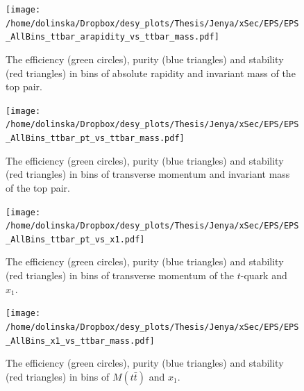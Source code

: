 \begin{figure}[p]
  \centering
  \texttt{[image: /home/dolinska/Dropbox/desy\_plots/Thesis/Jenya/xSec/EPS/EPS\_AllBins\_ttbar\_arapidity\_vs\_ttbar\_mass.pdf]}
  \caption{The efficiency (green circles), purity (blue triangles) and stability (red triangles) in bins of absolute rapidity and invariant mass of the top pair.}
  \label{fig:EPS_2D_ytt_Mtt}
\end{figure}

\begin{figure}[p]
  \centering
  \texttt{[image: /home/dolinska/Dropbox/desy\_plots/Thesis/Jenya/xSec/EPS/EPS\_AllBins\_ttbar\_pt\_vs\_ttbar\_mass.pdf]}
  \caption{The efficiency (green circles), purity (blue triangles) and stability (red triangles) in bins of transverse momentum and invariant mass of the top pair.}
  \label{fig:EPS_2D_pttt_Mtt}
\end{figure}

\begin{figure}[p]
  \centering
  \texttt{[image: /home/dolinska/Dropbox/desy\_plots/Thesis/Jenya/xSec/EPS/EPS\_AllBins\_ttbar\_pt\_vs\_x1.pdf]}
  \caption{The efficiency (green circles), purity (blue triangles) and stability (red triangles) in bins of transverse momentum of the $t$-quark and  $x_{1}$.}
  \label{fig:EPS_2D_ptt_x1}
\end{figure}

\begin{figure}[p]
  \centering
  \texttt{[image: /home/dolinska/Dropbox/desy\_plots/Thesis/Jenya/xSec/EPS/EPS\_AllBins\_x1\_vs\_ttbar\_mass.pdf]}
  \caption{The efficiency (green circles), purity (blue triangles) and stability (red triangles) in bins of $M(t\bar{t})$ and  $x_{1}$.}
  \label{fig:EPS_2D_Mtt_x1}
\end{figure}



